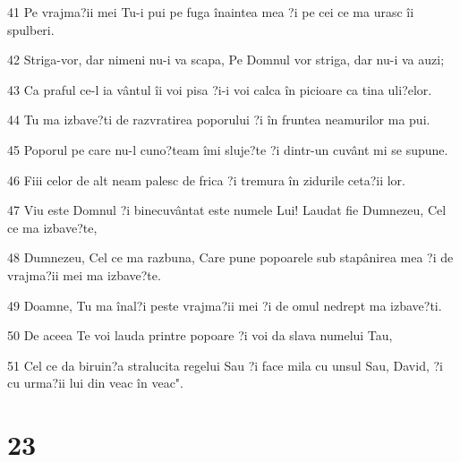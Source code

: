 \par 41 Pe vrajma?ii mei Tu-i pui pe fuga înaintea mea ?i pe cei ce ma urasc îi spulberi.
\par 42 Striga-vor, dar nimeni nu-i va scapa, Pe Domnul vor striga, dar nu-i va auzi;
\par 43 Ca praful ce-l ia vântul îi voi pisa ?i-i voi calca în picioare ca tina uli?elor.
\par 44 Tu ma izbave?ti de razvratirea poporului ?i în fruntea neamurilor ma pui.
\par 45 Poporul pe care nu-l cuno?team îmi sluje?te ?i dintr-un cuvânt mi se supune.
\par 46 Fiii celor de alt neam palesc de frica ?i tremura în zidurile ceta?ii lor.
\par 47 Viu este Domnul ?i binecuvântat este numele Lui! Laudat fie Dumnezeu, Cel ce ma izbave?te,
\par 48 Dumnezeu, Cel ce ma razbuna, Care pune popoarele sub stapânirea mea ?i de vrajma?ii mei ma izbave?te.
\par 49 Doamne, Tu ma înal?i peste vrajma?ii mei ?i de omul nedrept ma izbave?ti.
\par 50 De aceea Te voi lauda printre popoare ?i voi da slava numelui Tau,
\par 51 Cel ce da biruin?a stralucita regelui Sau ?i face mila cu unsul Sau, David, ?i cu urma?ii lui din veac în veac".

\chapter{23}

